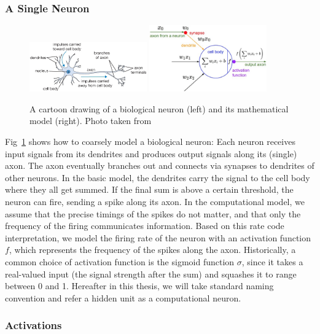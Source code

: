 \subsubsection{A Single Neuron}
\begin{figure}[t]
    \centering
    \includegraphics[width=0.45\textwidth]{figure/ch3-bioneuron.png}
    \includegraphics[width=0.45\textwidth]{figure/ch3-compneuron.png}
    \caption{A  cartoon drawing of a biological neuron (left) and its mathematical model (right). Photo taken from~\cite{links:cs231n-nn1}}
    \label{fig:ch3-neuron}
\end{figure}


Fig~\ref{fig:ch3-neuron} shows how to coarsely model a biological neuron: Each neuron receives input signals from its dendrites and produces output signals along its (single) axon. The axon eventually branches out and connects via synapses to dendrites of other neurons. In the basic model, the dendrites carry the signal to the cell body where they all get summed. If the final sum is above a certain threshold, the neuron can fire, sending a spike along its axon. In the computational model, we assume that the precise timings of the spikes do not matter, and that only the frequency of the firing communicates information. Based on this rate code interpretation, we model the firing rate of the neuron with an activation function $f$, which represents the frequency of the spikes along the axon. Historically, a common choice of activation function is the sigmoid function $\sigma$, since it takes a real-valued input (the signal strength after the sum) and squashes it to range between 0 and 1. Hereafter in this thesis, we will take standard naming convention and refer a hidden unit as a computational neuron.

\subsubsection{Activations}

